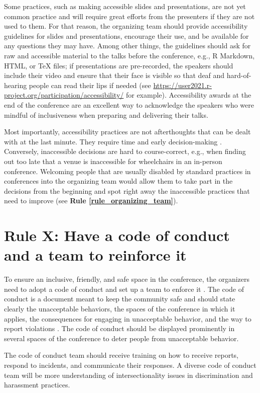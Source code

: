 \documentclass[10pt,letterpaper]{article}
\begin{document}
Some practices, such as making accessible slides and presentations, are not yet common practice and will require great efforts from the presenters if they are not used to them. 
For that reason, the organizing team should provide accessibility guidelines for slides and presentations, encourage their use, and be available for any questions they may have.  
Among other things, the guidelines should ask for raw and accessible material to the talks before the conference, e.g., R Markdown, HTML, or \TeX{} files; if presentations are pre-recorded, the speakers should include their video and ensure that their face is visible so that deaf and hard-of-hearing people can read their lips if needed (see \url{https://user2021.r-project.org/participation/accessibility/} for example). 
Accessibility awards at the end of the conference are an excellent way to acknowledge the speakers who were mindful of inclusiveness when preparing and delivering their talks. 

Most importantly, accessibility practices are not afterthoughts that can be dealt with at the last minute. 
They require time and early decision-making \cite{irish_increasing_2020}. 
Conversely, inaccessible decisions are hard to course-correct, e.g., when finding out too late that a venue is inaccessible for wheelchairs in an in-person conference. 
Welcoming people that are usually disabled by standard practices in conferences into the organizing team would allow them to take part in the decisions from the beginning and spot right away the inaccessible practices that need to improve (see \textbf{Rule \ref{rule_organizing_team}}). 


\section{Rule X: Have a code of conduct and a team to reinforce it}

To ensure an inclusive, friendly, and safe space in the conference, the organizers need to adopt a code of conduct and set up a team to enforce it \cite{favaro_your_2016}. The code of conduct is a document meant to keep the community safe and should state clearly the unacceptable behaviors, the spaces of the conference in which it applies, the consequences for engaging in unacceptable behavior, and the way to report violations \cite{aurora_how_2018}. 
The code of conduct should be displayed prominently in several spaces of the conference to deter people from unacceptable behavior.

The code of conduct team should receive training on how to receive reports, respond to incidents, and communicate their responses. A diverse code of conduct team will be more understanding of intersectionality issues in discrimination and harassment practices. 
\end{document}
